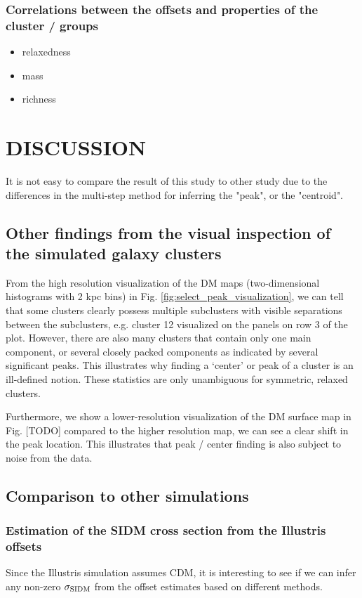 \subsubsection{Correlations between the offsets and properties of the 
cluster / groups}
\begin{itemize}
\item relaxedness
\item mass 
\item richness  
\end{itemize}



\section{DISCUSSION}\label{sec:discussion}
It is not easy to compare the result of this study to other study due to the 
differences in the multi-step method for inferring the "peak", or the
"centroid".

\subsection{Other findings from the visual inspection of the simulated galaxy clusters}
From the high resolution visualization of the DM maps (two-dimensional
histograms with 2 kpc bins) in 
Fig. \ref{fig:select_peak_visualization}, we can tell that some clusters clearly
possess multiple subclusters with visible separations between the subclusters, e.g. cluster 12 visualized on the panels on row 3 
of the plot. 
However, there are also many clusters that contain  
only one main component, or several closely packed components as indicated by
several significant peaks. 
This illustrates why finding a `center' or peak of a cluster is an ill-defined 
notion. These statistics are only unambiguous for symmetric, relaxed 
clusters.  

Furthermore, we show a lower-resolution visualization of the DM surface
map in Fig. [TODO] compared to the higher resolution map, we can see a clear
shift in the peak location. This illustrates that peak / center finding is also
subject to noise from the data.

\subsection{Comparison to other simulations}
\subsubsection{Estimation of the SIDM cross section from the Illustris offsets}
Since the Illustris simulation assumes CDM, it is interesting to see if we can
infer any non-zero $\sigma_{\rm SIDM}$ from the offset estimates based on
different methods.  

